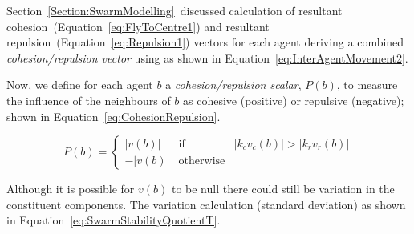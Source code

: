 \documentclass{ieeeaccess}
\begin{document}

Section~\ref{Section:SwarmModelling}~discussed calculation of resultant
cohesion~(Equation~\ref{eq:FlyToCentre1}) and resultant
repulsion~(Equation~\ref{eq:Repulsion1}) vectors for each agent deriving a
combined \textit{cohesion/repulsion vector} using as shown in
Equation~\ref{eq:InterAgentMovement2}. 


Now, we define for each agent $b$ a \textit{cohesion/repulsion scalar}, $P(b)$,
to measure the influence of the neighbours of $b$ as cohesive (positive) or
repulsive (negative); shown in Equation~\ref{eq:CohesionRepulsion}.

\begin{equation}
\label{eq:CohesionRepulsion}
P(b) = \left\{\begin{array}{lll}
               |v(b)|& \mathrm{if} & |k_cv_c(b)| > |k_r v_r(b)|\\
              -|v(b)|& \mathrm{otherwise}
              \end{array}\right.
\end{equation}

Although it is possible for $v(b)$ to be null there could still be variation in
the constituent components. The variation calculation (standard deviation) as
shown in Equation~\ref{eq:SwarmStabilityQuotientT}. 


\end{document}
